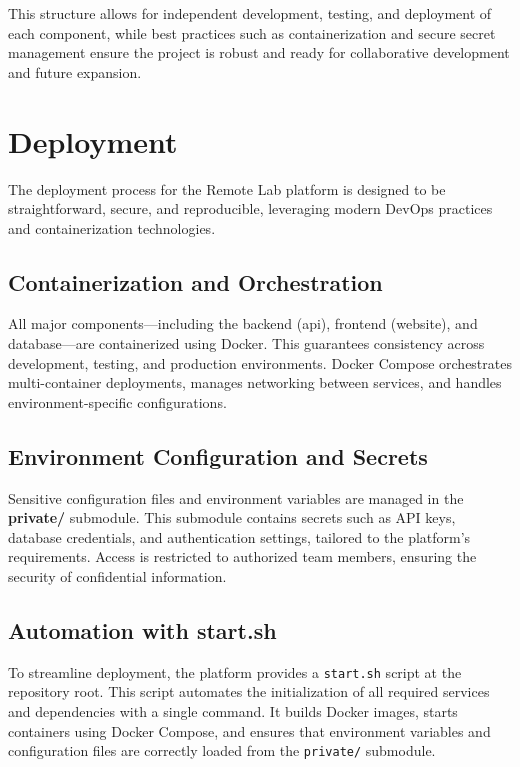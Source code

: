 This structure allows for independent development, testing, and deployment of each component, while best practices such as containerization and secure secret management ensure the project is robust and ready for collaborative development and future expansion.

\section{Deployment} \label{sec:deployment}

The deployment process for the Remote Lab platform is designed to be straightforward, secure, and reproducible, leveraging modern DevOps practices and containerization technologies.

\subsection{Containerization and Orchestration} \label{subsec:containerization}

All major components—including the backend (api), frontend (website), and database—are containerized using Docker. This guarantees consistency across development, testing, and production environments. Docker Compose orchestrates multi-container deployments, manages networking between services, and handles environment-specific configurations.

\subsection{Environment Configuration and Secrets} \label{subsec:env_config}

Sensitive configuration files and environment variables are managed in the \textbf{private/} submodule. This submodule contains secrets such as API keys, database credentials, and authentication settings, tailored to the platform's requirements. Access is restricted to authorized team members, ensuring the security of confidential information.

\subsection{Automation with start.sh} \label{subsec:automation_startsh}

To streamline deployment, the platform provides a \texttt{start.sh} script at the repository root. This script automates the initialization of all required services and dependencies with a single command. It builds Docker images, starts containers using Docker Compose, and ensures that environment variables and configuration files are correctly loaded from the \texttt{private/} submodule.

